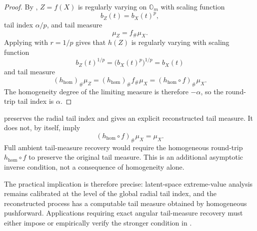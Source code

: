 \begin{proof}
By ,
\(Z=f(X)\) is regularly varying on \(\mathbb{O}_m\) with scaling function
\[
b_Z(t)=b_X(t)^p,
\]
tail index \(\alpha/p\), and tail measure
\[
\mu_Z=f_{\#}\mu_X.
\]
Applying  with \(r=1/p\) gives that
\(h(Z)\) is regularly varying with scaling function
\[
b_Z(t)^{1/p}
=
\bigl(b_X(t)^p\bigr)^{1/p}
=
b_X(t)
\]
and tail measure
\[
(h_{\mathrm{hom}})_{\#}\mu_Z
=
(h_{\mathrm{hom}})_{\#}f_{\#}\mu_X
=
(h_{\mathrm{hom}}\circ f)_{\#}\mu_X.
\]
The homogeneity degree of the limiting measure is therefore \(-\alpha\), so the
round-trip tail index is \(\alpha\).
\end{proof}

\begin{remark}
\label{rmk:index-vs-measure}
 preserves the radial tail index and gives
an explicit reconstructed tail measure. It does not, by itself, imply
\[
(h_{\mathrm{hom}}\circ f)_{\#}\mu_X=\mu_X.
\]
Full ambient tail-measure recovery would require the homogeneous round-trip
\(h_{\mathrm{hom}}\circ f\) to preserve the original tail measure. This is an
additional asymptotic inverse condition, not a consequence of homogeneity alone.
\end{remark}

The practical implication is therefore precise: latent-space extreme-value
analysis remains calibrated at the level of the global radial tail index, and
the reconstructed process has a computable tail measure obtained by homogeneous
pushforward. Applications requiring exact angular tail-measure recovery must
either impose or empirically verify the stronger condition in
.